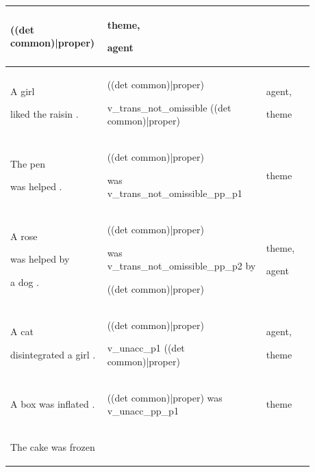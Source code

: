 \documentclass[11pt]{article}
\begin{document}
\begin{table}
\begin{tabular}{p{0.225\linewidth} p{0.50\linewidth} p{0.15\linewidth}}
\begin{tiny}
((det common)|proper)\end{tiny} & \begin{tiny}theme,

agent\end{tiny} \\
\hline
\begin{tiny}A girl 

liked the raisin .\end{tiny} & \begin{tiny}((det common)|proper)

v\_trans\_not\_omissible ((det common)|proper)\end{tiny} & \begin{tiny}agent,

theme\end{tiny} \\
\hline
\begin{tiny}The pen 

was helped .\end{tiny} & \begin{tiny}((det common)|proper)

was v\_trans\_not\_omissible\_pp\_p1\end{tiny} & \begin{tiny}theme\end{tiny} \\
\hline
\begin{tiny}A rose 

was helped by

a dog .\end{tiny} & \begin{tiny}((det common)|proper)

was v\_trans\_not\_omissible\_pp\_p2 by 

((det common)|proper)\end{tiny} & \begin{tiny}theme,

agent\end{tiny} \\
\hline
\begin{tiny}A cat 

disintegrated a girl .\end{tiny} & \begin{tiny}((det common)|proper)

v\_unacc\_p1 ((det common)|proper)\end{tiny} & \begin{tiny}agent,

theme\end{tiny} \\
\hline
\begin{tiny}A box was inflated .\end{tiny} & \begin{tiny}((det common)|proper) was v\_unacc\_pp\_p1\end{tiny} & \begin{tiny}theme\end{tiny} \\
\hline
\begin{tiny}The cake was frozen 


\end{tiny}
\end{tabular}
\end{table}
\end{document}
